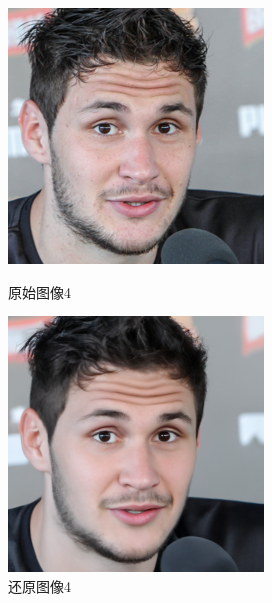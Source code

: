 \begin{figure}[H]
\begin{minipage}[b]{0.3\linewidth}
    \includegraphics[width=\linewidth]{Picture/label/00004.png}
    \caption{原始图像4}
    \label{original image }
  \end{minipage}
\hspace{0.1cm}
  \begin{minipage}[b]{0.3\linewidth}
    \includegraphics[width=\linewidth]{Picture/recon/00004.png}
    \caption{还原图像4}
    \label{inpainted image}
  \end{minipage}
\end{figure}



